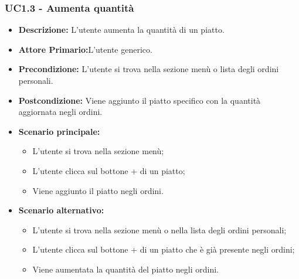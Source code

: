 \subsubsection{UC1.3 - Aumenta quantità}
\begin{itemize}
    \item \textbf{Descrizione:} L'utente aumenta la quantità di un piatto.
    \item \textbf{Attore Primario:}L'utente generico.
    \item \textbf{Precondizione:} L'utente si trova nella sezione menù o lista degli ordini personali.
    \item \textbf{Postcondizione:} Viene aggiunto il piatto specifico con la quantità aggiornata negli ordini.
    \item \textbf{Scenario principale:}
    \begin{itemize}
        \item L'utente si trova nella sezione menù;
        \item L'utente clicca sul bottone + di un piatto;
        \item Viene aggiunto il piatto negli ordini.
    \end{itemize}
    \item \textbf{Scenario alternativo:}
    \begin{itemize}
        \item L'utente si trova nella sezione menù o nella lista degli ordini personali;
        \item L'utente clicca sul bottone + di un piatto che è già presente negli ordini;
        \item Viene aumentata la quantità del piatto negli ordini.
    \end{itemize}
\end{itemize}
